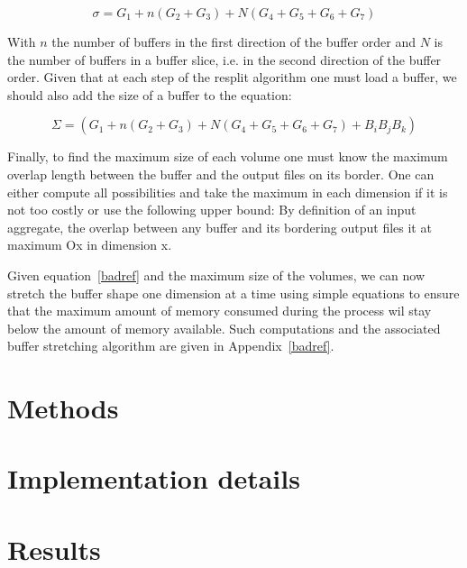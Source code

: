 \documentclass[conference]{IEEEtran}
\begin{document}
\begin{equation} \label{eq:1}
\sigma = G_1 + n(G_2 + G_3) + N(G_4 + G_5 + G_6 + G_7)
\end{equation}

With $n$ the number of buffers in the first direction of the buffer order and
$N$ is the number of buffers in a buffer slice, i.e. in the second direction of
the buffer order. Given that at each step of the resplit algorithm one must
load a buffer, we should also add the size of a buffer to the equation:

\begin{equation} \label{eq:2}
\Sigma = (G_1 + n(G_2 + G_3) + N(G_4 + G_5 + G_6 + G_7) + B_iB_jB_k)
\end{equation}

Finally, to find the maximum size of each volume one must know the maximum
overlap length between the buffer and the output files on its border. One can
either compute all possibilities and take the maximum in each dimension if it is
not too costly or use the following upper bound: By definition of an input
aggregate, the overlap between any buffer and its bordering output files it at
maximum Ox in dimension x.

Given equation~\ref{badref} and the maximum size of the volumes, we can now
stretch the buffer shape one dimension at a time using simple equations to ensure
that the maximum amount of memory consumed during the process wil stay below the
amount of memory available. Such computations and the associated buffer stretching
algorithm are given in Appendix~\ref{badref}.

\section{Methods}

\section{Implementation details}

\section{Results}

\end{document}
